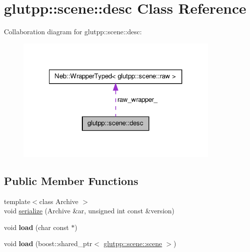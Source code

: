 \hypertarget{classglutpp_1_1scene_1_1desc}{\section{glutpp\-:\-:scene\-:\-:desc \-Class \-Reference}
\label{classglutpp_1_1scene_1_1desc}
}


\-Collaboration diagram for glutpp\-:\-:scene\-:\-:desc\-:\nopagebreak
\begin{figure}[H]
\begin{center}
\leavevmode
\includegraphics[width=282pt]{classglutpp_1_1scene_1_1desc__coll__graph}
\end{center}
\end{figure}
\subsection*{\-Public \-Member \-Functions}
\begin{DoxyCompactItemize}
\item 
{\footnotesize template$<$class Archive $>$ }\\void \hyperlink{classglutpp_1_1scene_1_1desc_a90063754f769b68b932ee7a54c252d69}{serialize} (\-Archive \&ar, unsigned int const \&version)
\item 
\hypertarget{classglutpp_1_1scene_1_1desc_a7f68fd9fba4752e874f12ed7a4deaeaf}{void {\bfseries load} (char const $\ast$)}\label{classglutpp_1_1scene_1_1desc_a7f68fd9fba4752e874f12ed7a4deaeaf}

\item 
\hypertarget{classglutpp_1_1scene_1_1desc_a7d5bcfef9cb840cde257ce5281ffa5d4}{void {\bfseries load} (boost\-::shared\-\_\-ptr$<$ \hyperlink{classglutpp_1_1scene_1_1scene}{glutpp\-::scene\-::scene} $>$)}\label{classglutpp_1_1scene_1_1desc_a7d5bcfef9cb840cde257ce5281ffa5d4}

\end{DoxyCompactItemize}

